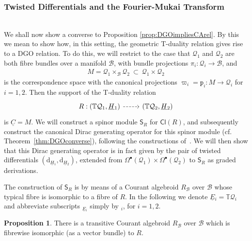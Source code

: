 \documentclass[a4paper, reqno, 11pt]{amsart}
\numberwithin{equation}{section}
\theoremstyle{definition}
\newtheorem{proposition}[equation]{Proposition}
\newcommand{\red}[1]{\underline{#1}}
\newcommand{\de}{\mathrm{d}}
\newcommand{\rmp}{\mathtt{p}}
\newcommand{\IT}{\mathbb{T}}
\newcommand{\Cl}{\mathsf{Cl}}
\newcommand{\cB}{{\mathcal B}}
\newcommand{\cQ}{{\mathcal Q}}
\newcommand{\sfS}{{\mathsf{S}}}
\newcommand{\sfOmega}{{\mathsf{\Omega}}}
\theoremstyle{remark}
\begin{document}
\medskip

\subsubsection{Twisted Differentials and the Fourier-Mukai Transform}\label{ssec:twisteddifferential}~\\[5pt]
We shall now show a converse to Proposition \ref{prop:DGOimpliesCArel}. By this we mean to show how, in this setting, the geometric T-duality relation gives rise to a DGO relation. To do this, we will restrict to the case that $\cQ_1$ and $\cQ_2$ are both fibre bundles over a manifold $\cB$, with bundle projections $\pi_i:\cQ_i\to\cB$, and 
\begin{align}
    M = \cQ_1\times_\cB\cQ_2 \ \subset \ \cQ_1\times\cQ_2
\end{align}
is the correspondence space with the canonical projections $\varpi_i=\rmp_i:M\to\cQ_i$ for $i=1,2$. Then the support of the T-duality relation 
\begin{equation}
\begin{tikzcd} 
R:(\IT\cQ_1,\red H{}_1) \ar[r,dashed] & (\IT\cQ_2,\red H{}_2)
\end{tikzcd}
\end{equation}
is $\red C=M$.
We will construct a spinor module $\sfS_R$ for $\Cl(R)$, and subsequently construct the canonical Dirac generating operator for this spinor module (cf. Theorem~\ref{thm:DGOconverse}), following the constructions of~\cite{Cortes:2019roa}. We will then show that this Dirac generating operator is in fact given by the pair of twisted differentials $(\de_{\red H{}_1}, \de_{\red H{}_2})$, extended from $\sfOmega^\bullet(\cQ_1)\times\sfOmega^\bullet(\cQ_2)$ to $\sfS_R$ as graded derivations.

The construction of $\sfS_R$ is by means of  a Courant algebroid $R_\cB$ over $\cB$ whose typical fibre is isomorphic to a fibre of $R$. In the following we denote $\red E{}_i=\IT\cQ_i$ and abbreviate subscripts ${}_{\red E{}_i}$ simply by ${}_i$, for $i=1,2.$

\begin{proposition}\label{prop:regCAonB}
    There is a transitive Courant algebroid $R_\cB$ over $\cB$ which is fibrewise isomorphic (as a vector bundle) to $R$. 
\end{proposition}
\end{document}
